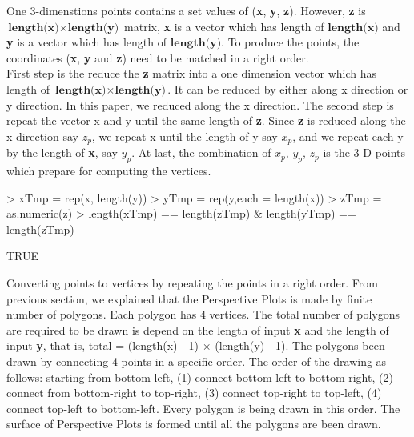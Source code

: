 \documentclass[11pt]{report}
\begin{document}
One 3-dimenstions points contains a set values of (\textbf{x}, \textbf{y}, \textbf{z}). However, \textbf{z} is $\textbf{length(x)} \times \textbf{length(y)}$ matrix, \textbf{x} is a vector which has length of $\textbf{length(x)}$ and \textbf{y} is a vector which has length of $\textbf{length(y)}$. To produce the points, the coordinates (\textbf{x}, \textbf{y} and \textbf{z}) need to be matched in a right order.\\

First step is the reduce the \textbf{z} matrix into a one dimension vector which has length of $\textbf{length(x)} \times \textbf{length(y)}$. It can be reduced by either along x direction or y direction. In this paper, we reduced along the x direction. The second step is repeat the vector x and y until the same length of \textbf{z}. Since \textbf{z} is reduced along the x direction say $z_p$, we repeat x until the length of y say $x_p$, and we repeat each y by the length of \textbf{x}, say $y_p$. At last, the combination of $x_p$, $y_p$, $z_p$ is the 3-D points which prepare for computing the vertices. \\
\begin{Schunk}
\begin{Sinput}
> xTmp = rep(x, length(y))
> yTmp = rep(y,each = length(x))
> zTmp = as.numeric(z)
> length(xTmp) == length(zTmp) & length(yTmp) == length(zTmp)
\end{Sinput}
\begin{Soutput}
[1] TRUE
\end{Soutput}
\end{Schunk}

Converting points to vertices by repeating the points in a right order. From previous section, we explained that the Perspective Plots is made by finite number of polygons. Each polygon has 4 vertices. The total number of polygons are required to be drawn is depend on the length of input \textbf{x} and the length of input \textbf{y}, that is, total = (length(x) - 1) $\times$ (length(y) - 1). The polygons been drawn by connecting 4 points in a specific order. The order of the drawing as follows: starting from bottom-left, (1) connect bottom-left to bottom-right, (2) connect from bottom-right to top-right, (3) connect top-right to top-left, (4) connect top-left to bottom-left. Every polygon is being drawn in this order. The surface of Perspective Plots is formed until all the polygons are been drawn. \\
\end{document}
